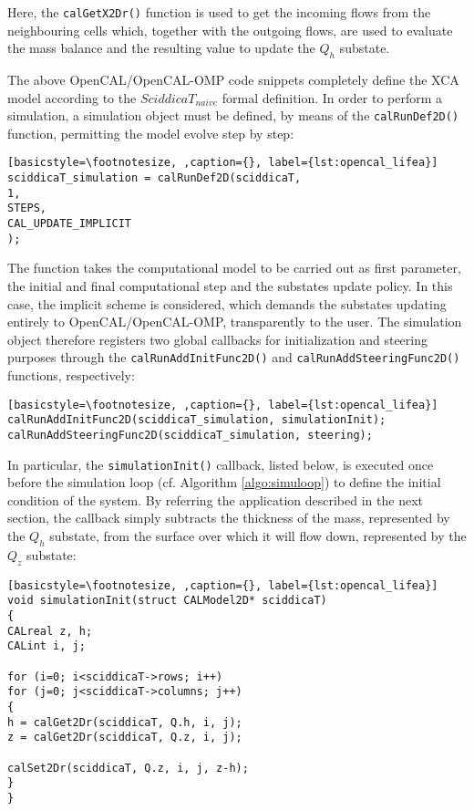 \noindent Here, the \verb'calGetX2Dr()' function is used to get the
incoming flows from the neighbouring cells which, together with the
outgoing flows, are used to evaluate the mass balance and the
resulting value to update the $Q_h$ substate.

The above OpenCAL/OpenCAL-OMP code snippets completely define the
XCA model according to the $SciddicaT_{naive}$ formal definition. In
order to perform a simulation, a simulation object must be defined,
by means of the \verb'calRunDef2D()' function, permitting the model
evolve step by step:

\begin{lstlisting}[basicstyle=\footnotesize, ,caption={}, label={lst:opencal_lifea}]
sciddicaT_simulation = calRunDef2D(sciddicaT,
1,
STEPS,
CAL_UPDATE_IMPLICIT
);
\end{lstlisting}

\noindent The function takes the computational model to be carried out as
first parameter, the initial and final computational step and the
substates update policy. In this case, the implicit scheme is
considered, which demands the substates updating entirely to
OpenCAL/OpenCAL-OMP, transparently to the user. The simulation
object therefore registers two global callbacks for initialization
and steering purposes through the \verb'calRunAddInitFunc2D()' and
\verb'calRunAddSteeringFunc2D()' functions, respectively:

\begin{lstlisting}[basicstyle=\footnotesize, ,caption={}, label={lst:opencal_lifea}]
calRunAddInitFunc2D(sciddicaT_simulation, simulationInit);
calRunAddSteeringFunc2D(sciddicaT_simulation, steering);
\end{lstlisting}

\noindent In particular, the \verb'simulationInit()' callback, listed below,
is executed once before the simulation loop (cf. Algorithm
\ref{algo:simuloop}) to define the initial condition of the
system. By referring the application described in the next section,
the callback simply subtracts the thickness of the mass, represented
by the $Q_h$ substate, from the surface over which it will
flow down, represented by the $Q_z$ substate:

\begin{lstlisting}[basicstyle=\footnotesize, ,caption={}, label={lst:opencal_lifea}]
void simulationInit(struct CALModel2D* sciddicaT)
{
CALreal z, h;
CALint i, j;

for (i=0; i<sciddicaT->rows; i++)
for (j=0; j<sciddicaT->columns; j++)
{
h = calGet2Dr(sciddicaT, Q.h, i, j);
z = calGet2Dr(sciddicaT, Q.z, i, j);

calSet2Dr(sciddicaT, Q.z, i, j, z-h);
}
}
\end{lstlisting}

